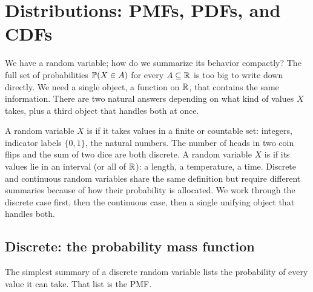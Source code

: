 \bigskip



\section{Distributions: PMFs, PDFs, and CDFs}
\label{sec:distributions}


We have a random variable; how do we summarize its behavior compactly? The full set of probabilities $\mathbb{P}(X \in A)$ for every $A \subseteq \mathbb{R}$ is too big to write down directly. We need a single object, a function on $\mathbb{R}$, that contains the same information. There are two natural answers depending on what kind of values $X$ takes, plus a third object that handles both at once.


A random variable $X$ is  if it takes values in a finite or countable set: integers, indicator labels $\{0, 1\}$, the natural numbers. The number of heads in two coin flips and the sum of two dice are both discrete. A random variable $X$ is  if its values lie in an interval (or all of $\mathbb{R}$): a length, a temperature, a time. Discrete and continuous random variables share the same definition but require different summaries because of how their probability is allocated. We work through the discrete case first, then the continuous case, then a single unifying object that handles both.


\subsection*{Discrete: the probability mass function}

The simplest summary of a discrete random variable lists the probability of every value it can take. That list is the PMF.

